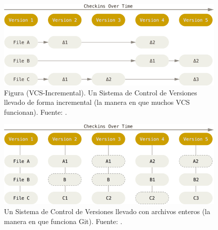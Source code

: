 \begin{figure}
  \begin{center}
      \includegraphics[width=\textwidth]{Figures/vcs-incremental.png}
  \end{center}
  \caption{Figura (VCS-Incremental). Un Sistema de Control de Versiones llevado de forma incremental (la manera en que muchos VCS funcionan). Fuente: \citep{PROGIT-Git-Intro}.}
  \label{VCS-Incremental}
\end{figure}

\begin{figure}
  \begin{center}
      \includegraphics[width=\textwidth]{Figures/vcs-backup.png}
  \end{center}
  \caption{Un Sistema de Control de Versiones llevado con archivos enteros (la manera en que funciona Git). Fuente: \citep{PROGIT-Git-Intro}.}
  \label{VCS-Backup}
\end{figure}

